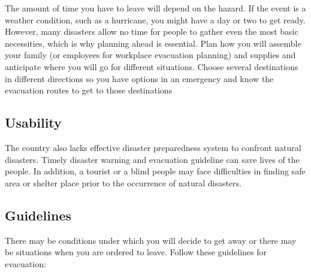 \documentclass{scrreprt}
\begin{document}
The amount of time you have to leave will depend on the hazard. If the event is a weather condition, such as a hurricane, you might have a day or two to get ready. However, many disasters allow no time for people to gather even the most basic necessities, which is why planning ahead is essential. Plan how you will assemble your family (or employees for workplace evacuation planning) and supplies and anticipate where you will go for different situations. Choose several destinations in different directions so you have options in an emergency and know the evacuation routes to get to those destinations


\subsection{Usability}

The country also lacks effective disaster preparedness system to confront natural disasters. Timely disaster warning and evacuation guideline can save lives of the people. In addition, a tourist or a blind people may face difficulties in finding safe area or shelter place prior to the occurrence of natural disasters.

\subsection{Guidelines}
There may be conditions under which you will decide to get away or there may be situations when you are ordered to leave. Follow these guidelines for evacuation:
\end{document}
